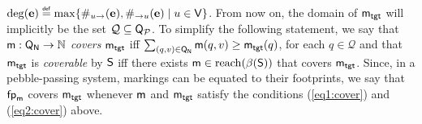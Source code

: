 $\deg(\mathbf{e}) \stackrel{\scriptscriptstyle{\mathsf{def}}}{=} \max\{\#_{{u}\to}(\mathbf{e}), \#_{\to{u}}(\mathbf{e}) \mid u\in\mathsf{V}\}$.
From now on, the domain of $\mathsf{m}_\mathsf{tgt}$ will implicitly be the set $\mathcal{Q}
\subseteq \mathsf{Q}_{\mathcal{P}}$. To simplify the following statement, we
say that $\mathsf{m} : \mathsf{Q}_{\mathsf{N}} \rightarrow \mathbb{N}$ \emph{covers}
$\mathsf{m}_\mathsf{tgt}$ iff $\sum_{(q,v)\in\mathsf{Q}_{\mathsf{N}}} \mathsf{m}(q,v) \geq
\mathsf{m}_\mathsf{tgt}(q)$, for each $q \in \mathcal{Q}$ and that $\mathsf{m}_\mathsf{tgt}$ is
\emph{coverable} by $\mathsf{S}$ iff there exists
$\mathsf{m}\in\mathrm{reach}({\beta({\mathsf{S}})})$ that covers $\mathsf{m}_\mathsf{tgt}$. Since, in a
pebble-passing system, markings can be equated to their footprints, we
say that $\mathsf{fp}_{\mathsf{m}}$ covers $\mathsf{m}_\mathsf{tgt}$ whenever $\mathsf{m}$ and
$\mathsf{m}_\mathsf{tgt}$ satisfy the conditions (\ref{eq1:cover}) and (\ref{eq2:cover}) above.


